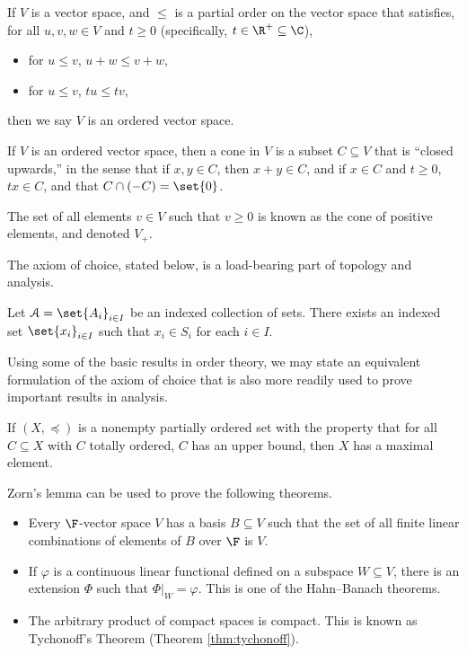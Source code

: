 \begin{example}
  If $V$ is a vector space, and $\leq$ is a partial order on the vector space that satisfies, for all $u,v,w\in V$ and $t\geq 0$ (specifically, $t\in \R^{+}\subseteq \C$),
  \begin{itemize}
    \item for $u\leq v$, $u + w \leq v + w$,
    \item for $u\leq v$, $tu \leq tv$,
  \end{itemize}
  then we say $V$ is an ordered vector space.\newline

  If $V$ is an ordered vector space, then a cone in $V$ is a subset $C\subseteq V$ that is ``closed upwards,'' in the sense that if $x,y\in C$, then $x+y\in C$, and if $x\in C$ and $t\geq 0$, $tx\in C$, and that $C\cap \left(-C\right) = \set{0}$.\newline

  The set of all elements $v\in V$ such that $v\geq 0$ is known as the cone of positive elements, and denoted $V_{+}$.
\end{example}

The axiom of choice, stated below, is a load-bearing part of topology and analysis.
\begin{definition}
  Let $\mathcal{A} = \set{A_i}_{i\in I}$ be an indexed collection of sets. There exists an indexed set $\set{x_i}_{i\in I}$ such that $x_i\in S_i$ for each $i\in I$.
\end{definition}
Using some of the basic results in order theory, we may state an equivalent formulation of the axiom of choice that is also more readily used to prove important results in analysis.
\begin{theorem}\label{thm:zorns_lemma}
  If $\left(X,\preceq\right)$ is a nonempty partially ordered set with the property that for all $C\subseteq X$ with $C$ totally ordered, $C$ has an upper bound, then $X$ has a maximal element.
\end{theorem}
Zorn's lemma can be used to prove the following theorems.
\begin{example}\label{ex:results_follow_from_axiom_of_choice}\hfill
  \begin{itemize}
    \item Every $\F$-vector space $V$ has a basis $B\subseteq V$ such that the set of all finite linear combinations of elements of $B$ over $\F$ is $V$.
    \item If $\varphi$ is a continuous linear functional defined on a subspace $W\subseteq V$, there is an extension $\Phi$ such that $\Phi|_{W} = \varphi$. This is one of the Hahn--Banach theorems. %
    \item The arbitrary product of compact spaces is compact. This is known as Tychonoff's Theorem (Theorem \ref{thm:tychonoff}). %
  \end{itemize}
\end{example}
